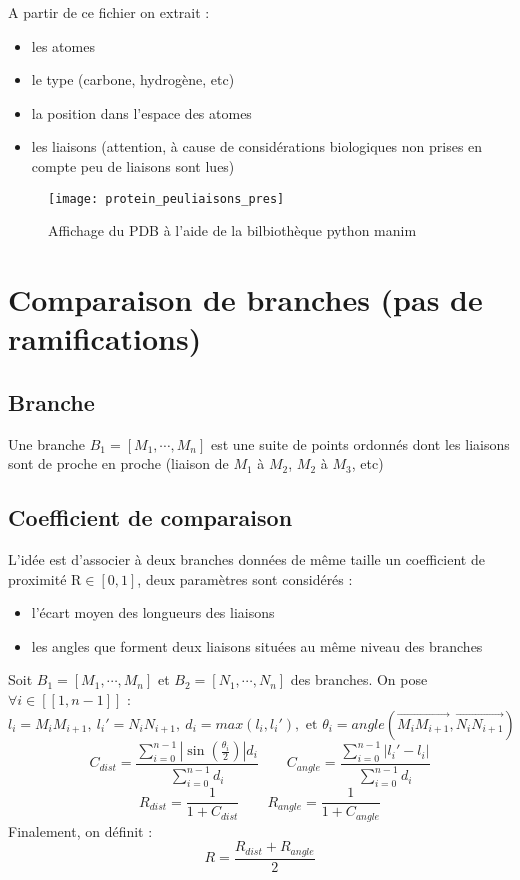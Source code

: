 \documentclass[a4paper, french, twoside]{article}
\begin{document}
A partir de ce fichier on extrait :
\begin{itemize}
    \item les atomes
    \item le type (carbone, hydrogène, etc)
    \item la position dans l'espace des atomes
    \item les liaisons (attention, à cause de considérations biologiques non prises en compte peu de liaisons sont lues)
\end{itemize}
\begin{figure}[!htb]
    \centering
    \texttt{[image: protein\_peuliaisons\_pres]}
    \caption{\label{fig:lecture_pdb} Affichage du PDB à l'aide de la bilbiothèque python manim}
\end{figure}

\section{Comparaison de branches (pas de ramifications)}

\subsection{Branche}
Une branche $B_1 = [M_1,\cdots,M_n]$ est une suite de points ordonnés dont les liaisons sont de proche en proche (liaison de $M_1$ à $M_2$, $M_2$ à $M_3$, etc)
\subsection{Coefficient de comparaison}
L'idée est d'associer à deux branches données de même taille un coefficient de proximité R$\in [0,1]$, deux paramètres sont considérés :
\begin{itemize}
    \item l'écart moyen des longueurs des liaisons
    \item les angles que forment deux liaisons situées au même niveau des branches
\end{itemize}
Soit $B_1 = [M_1,\cdots,M_n]$ et $B_2 = [N_1,\cdots,N_n]$ des branches.
On pose $\forall i \in [\![1,n-1]\!]$ :
\begin{equation*}
l_i = M_iM_{i+1},\ l_i' = N_iN_{i+1},\ d_i = max(l_i,l_i'), \text{ et }
\theta_i = angle(  \overrightarrow{M_iM_{i+1}} ,   \overrightarrow{N_iN_{i+1}} ) 
\end{equation*}
\begin{equation*}
    C_{dist} = \frac{\displaystyle\sum_{i=0}^{n-1} | \sin(\frac{\theta_{i}}{2}) | d_i}{\displaystyle\sum_{i=0}^{n-1} d_i} \qquad  
    C_{angle} = \frac{\displaystyle\sum_{i=0}^{n-1} |l_i' - l_i|}{\displaystyle\sum_{i=0}^{n-1} d_i}
\end{equation*}
\begin{equation*}
    R_{dist} = \frac{1}{1 + C_{dist}} \qquad R_{angle} = \frac{1}{1 + C_{angle}}
\end{equation*}
\newline Finalement, on définit : \newline
\begin{equation*}
    \boxed{R = \frac{R_{dist}+R_{angle}}{2}}
\end{equation*}
\end{document}
